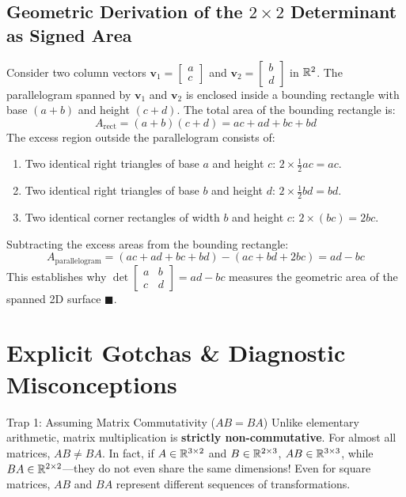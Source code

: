\subsection{Geometric Derivation of the $2 \times 2$ Determinant as Signed Area}
Consider two column vectors $\mathbf{v}_1 = \begin{bmatrix} a \\ c \end{bmatrix}$ and $\mathbf{v}_2 = \begin{bmatrix} b \\ d \end{bmatrix}$ in $\mathbb{R}^2$. 
The parallelogram spanned by $\mathbf{v}_1$ and $\mathbf{v}_2$ is enclosed inside a bounding rectangle with base $(a + b)$ and height $(c + d)$.
The total area of the bounding rectangle is:
\begin{equation}
A_{\text{rect}} = (a + b)(c + d) = ac + ad + bc + bd
\end{equation}
The excess region outside the parallelogram consists of:
\begin{enumerate}
    \item Two identical right triangles of base $a$ and height $c$: $2 \times \frac{1}{2} ac = ac$.
    \item Two identical right triangles of base $b$ and height $d$: $2 \times \frac{1}{2} bd = bd$.
    \item Two identical corner rectangles of width $b$ and height $c$: $2 \times (bc) = 2bc$.
\end{enumerate}
Subtracting the excess areas from the bounding rectangle:
\begin{equation}
A_{\text{parallelogram}} = (ac + ad + bc + bd) - (ac + bd + 2bc) = ad - bc
\end{equation}
This establishes why $\det \begin{bmatrix} a & b \\ c & d \end{bmatrix} = ad - bc$ measures the geometric area of the spanned 2D surface $\blacksquare$.

\section{Explicit Gotchas \& Diagnostic Misconceptions}

\begin{trapbox}{Trap 1: Assuming Matrix Commutativity ($AB = BA$)}
Unlike elementary arithmetic, matrix multiplication is \textbf{strictly non-commutative}. For almost all matrices, $AB \neq BA$. In fact, if $A \in \mathbb{R}^{3 \times 2}$ and $B \in \mathbb{R}^{2 \times 3}$, $AB \in \mathbb{R}^{3 \times 3}$, while $BA \in \mathbb{R}^{2 \times 2}$---they do not even share the same dimensions! Even for square matrices, $AB$ and $BA$ represent different sequences of transformations.
\end{trapbox}

